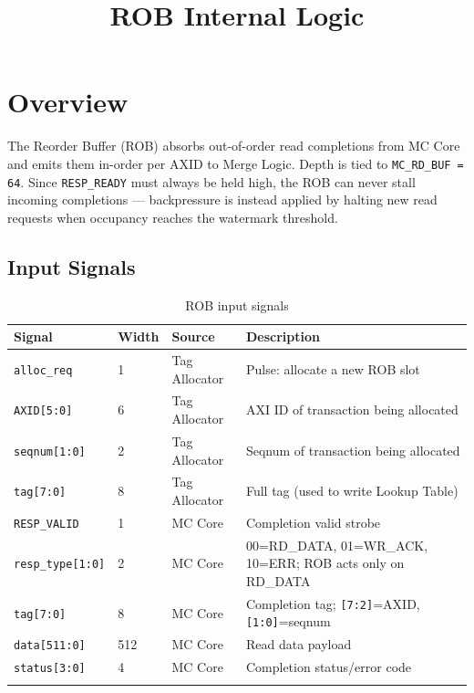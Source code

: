 \documentclass[11pt]{article}
\title{\textbf{ROB Internal Logic}}
\date{}
\author{}
\begin{document}
\maketitle
\thispagestyle{empty}

\section{Overview}

The Reorder Buffer (ROB) absorbs out-of-order read completions from MC Core and emits them in-order per AXID to Merge Logic. Depth is tied to \texttt{MC\_RD\_BUF = 64}. Since \texttt{RESP\_READY} must always be held high, the ROB can never stall incoming completions — backpressure is instead applied by halting new read requests when occupancy reaches the watermark threshold.

\subsection*{Input Signals}
\begin{longtable}{p{3cm}p{1cm}p{3cm}p{7cm}}
\toprule
\textbf{Signal} & \textbf{Width} & \textbf{Source} & \textbf{Description} \\
\midrule
\texttt{alloc\_req}     & 1   & Tag Allocator & Pulse: allocate a new ROB slot \\
\texttt{AXID[5:0]}      & 6   & Tag Allocator & AXI ID of transaction being allocated \\
\texttt{seqnum[1:0]}    & 2   & Tag Allocator & Seqnum of transaction being allocated \\
\texttt{tag[7:0]}       & 8   & Tag Allocator & Full tag (used to write Lookup Table) \\
\texttt{RESP\_VALID}    & 1   & MC Core       & Completion valid strobe \\
\texttt{resp\_type[1:0]}& 2   & MC Core       & 00=RD\_DATA, 01=WR\_ACK, 10=ERR; ROB acts only on RD\_DATA \\
\texttt{tag[7:0]}       & 8   & MC Core       & Completion tag; \texttt{[7:2]}=AXID, \texttt{[1:0]}=seqnum \\
\texttt{data[511:0]}    & 512 & MC Core       & Read data payload \\
\texttt{status[3:0]}    & 4   & MC Core       & Completion status/error code \\
\bottomrule
\caption{ROB input signals}
\end{longtable}
\end{document}
